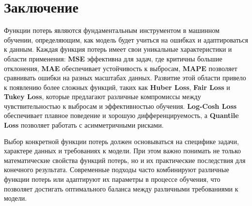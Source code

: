 \section{Заключение}

Функции потерь являются фундаментальным инструментом в машинном обучении, определяющим, как модель будет учиться на ошибках и адаптироваться к данным. Каждая функция потерь имеет свои уникальные характеристики и области применения: \textbf{MSE} эффективна для задач, где критичны большие отклонения, \textbf{MAE} обеспечивает устойчивость к выбросам, \textbf{MAPE} позволяет сравнивать ошибки на разных масштабах данных. Развитие этой области привело к появлению более сложных функций, таких как \textbf{Huber Loss}, \textbf{Fair Loss} и \textbf{Tukey Loss}, которые предлагают различные компромиссы между чувствительностью к выбросам и эффективностью обучения. \textbf{Log-Cosh Loss} обеспечивает плавное поведение и хорошую дифференцируемость, а \textbf{Quantile Loss} позволяет работать с асимметричными рисками.

Выбор конкретной функции потерь должен основываться на специфике задачи, характере данных и требованиях к модели. При этом важно понимать не только математические свойства функций потерь, но и их практические последствия для конечного результата. Современные подходы часто комбинируют различные функции потерь или адаптируют их параметры в процессе обучения, что позволяет достигать оптимального баланса между различными требованиями к модели.




